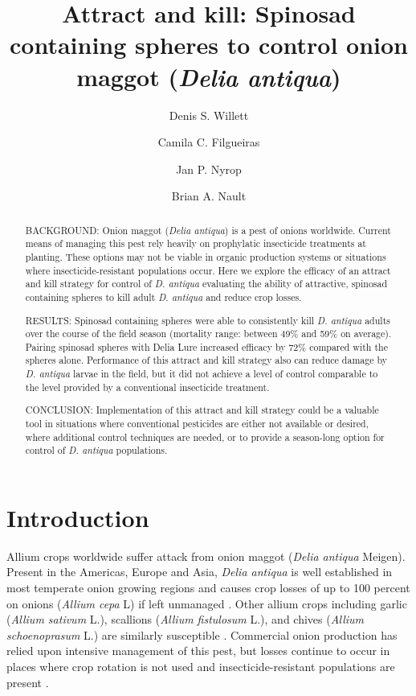 \documentclass[num-refs]{wiley-article}
\title{Attract and kill: Spinosad containing spheres to control onion maggot (\textit{Delia antiqua})}
\author[1\authfn{1}]{Denis S. Willett}
\author[1\authfn{1}]{Camila C. Filgueiras}
\author[1]{Jan P. Nyrop}
\author[1]{Brian A. Nault}
\affil[1]{Department of Entomology, Cornell AgriTech, Cornell University, Geneva, NY, 14456, USA}
\begin{document}
\maketitle

\begin{abstract}

BACKGROUND: Onion maggot (\textit{Delia antiqua}) is a pest of onions worldwide. Current means of managing this pest rely heavily on prophylatic insecticide treatments at planting. These options may not be viable in organic production systems or situations where insecticide-resistant populations occur. Here we explore the efficacy of an attract and kill strategy for control of \textit{D. antiqua} evaluating the ability of attractive, spinosad containing spheres to kill adult \textit{D. antiqua} and reduce crop losses. 

RESULTS: Spinosad containing spheres were able to consistently kill \textit{D. antiqua} adults over the course of the field season (mortality range: between 49\% and 59\% on average). Pairing spinosad spheres with Delia Lure increased efficacy by 72\% compared with the spheres alone. Performance of this attract and kill strategy also can reduce damage by \textit{D. antiqua}  larvae in the field, but it did not achieve a level of control comparable to the level provided by a conventional insecticide treatment. 

CONCLUSION: Implementation of this attract and kill strategy could be a valuable tool in situations where conventional pesticides are either not available or desired, where additional control techniques are needed, or to provide a season-long option for control of \textit{D. antiqua} populations.

\end{abstract}

\linenumbers
\section{Introduction}

Allium crops worldwide suffer attack from onion maggot (\textit{Delia antiqua} Meigen).  Present in the Americas, Europe and Asia, \textit{Delia antiqua} is well established in most temperate onion growing regions and causes crop losses of up to 100 percent on onions (\textit{Allium cepa} L) if left unmanaged \cite{nault2006performance, nault2006onion}.  Other allium crops including garlic (\textit{Allium sativum} L.), scallions (\textit{Allium fistulosum} L.), and chives (\textit{Allium schoenoprasum} L.) are similarly susceptible \citep{ellis1979factors,ning2017predicting,nault2007ecology}.  Commercial onion production has relied upon intensive management of this pest, but losses continue to occur in places where crop rotation is not used and insecticide-resistant populations are present \citep{martinson1988dispersal, nault2006onion}.  
\end{document}
